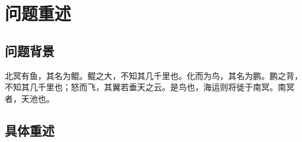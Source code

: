 
\section{问题重述}

\subsection{问题背景}

\zhlipsum[1]

北冥有鱼，其名为鲲。鲲之大，不知其几千里也。化而为鸟，其名为鹏。鹏之背，不知其几千里也；怒而飞，其翼若垂天之云。是鸟也，海运则将徙于南冥。南冥者，天池也。

\zhlipsum[3]

\subsection{具体重述}

\zhlipsum[3]


